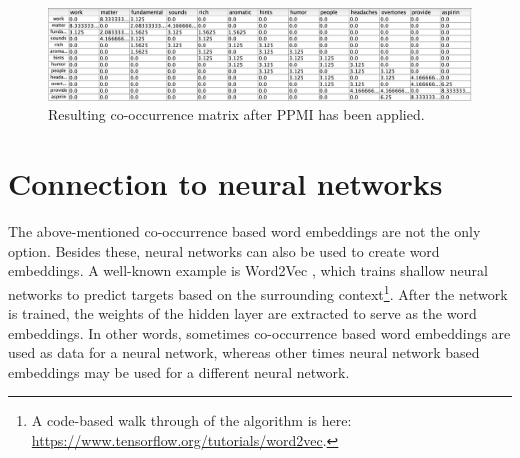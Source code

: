 \begin{figure}[h]
    \centering
    \includegraphics[scale=.45]{./images/weighted_cooc_matrix.png}
    \caption[Generated using Simbrain.]{Resulting co-occurrence matrix after PPMI has been applied.}
 \label{ppmiExample}
\end{figure}


\section{Connection to neural networks}

The above-mentioned co-occurrence based word embeddings are not the only option. Besides these, neural networks can also be used to create word embeddings. A well-known example is Word2Vec \cite{mikolov2013distributed}, which trains shallow neural networks to predict targets based on the surrounding context\footnote{A code-based walk through of the algorithm is here:  \url{https://www.tensorflow.org/tutorials/word2vec}.}. After the network is trained, the weights of the hidden layer are extracted to serve as the word embeddings. In other words, sometimes co-occurrence based word embeddings are used as data for a neural network, whereas other times neural network based embeddings may be used for a different neural network.